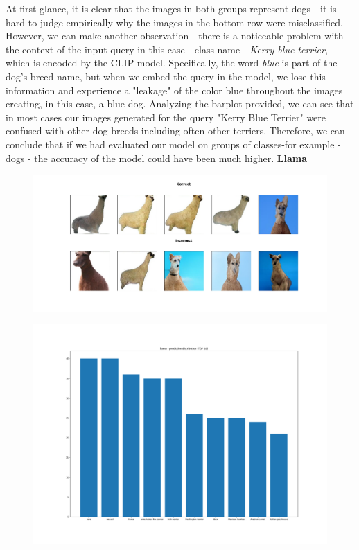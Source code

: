 \documentclass[12pt,a4paper,openany]{book}
\begin{document}
\newline
\noindent At first glance, it is clear that the images in both groups represent dogs - it is hard to judge empirically why the images in the bottom row were misclassified. However, we can make another observation - there is a noticeable problem with the context of the input query in this case - class name - \textit{Kerry blue terrier}, which is encoded by the CLIP model. Specifically, the word \textit{blue} is part of the dog's breed name, but when we embed the query in the model, we lose this information and experience a "leakage" of the color blue throughout the images creating, in this case, a blue dog.  Analyzing the barplot provided, we can see that in most cases our images generated for the query "Kerry Blue Terrier" were confused with other dog breeds including often other terriers. Therefore, we can conclude that if we had evaluated our model on groups of classes-for example - dogs - the accuracy of the model could have been much higher.
\newline
\noindent \textbf{Llama} \\
\begin{figure}[ht!]
    \centering
    \includegraphics[scale=0.3]{figs/imagenet_examples/llama.png}
\end{figure}
\begin{figure}[ht!]
    \centering
    \includegraphics[scale=0.3]{figs/imagenet_examples/llama_imagenet_dist.png}
\end{figure}
\end{document}
